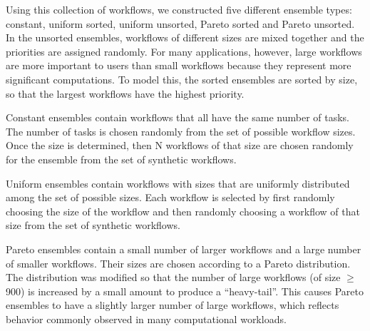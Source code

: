 \documentclass[conference]{IEEEtran}
\begin{document}
Using this collection of workflows, we constructed five different ensemble types:
constant, uniform sorted, uniform unsorted, Pareto sorted and Pareto unsorted.
In the unsorted ensembles, workflows of different sizes are mixed together and
the priorities are assigned randomly.
For many applications, however, large workflows are
more important to users than small workflows because they represent more
significant computations. To model this, the sorted ensembles are sorted by
size, so that the largest workflows have the highest priority.

Constant ensembles contain workflows that all have the same number of tasks. 
The number of tasks is chosen randomly from the set of
possible workflow sizes. Once the size is determined, then N workflows of that
size are chosen randomly for the ensemble from the set of synthetic workflows.

Uniform ensembles contain workflows with sizes that are uniformly distributed
among the set of possible sizes. Each workflow 
is selected by first randomly choosing the size of the workflow
and then randomly choosing a workflow of that size from the set of
synthetic workflows.

Pareto ensembles contain a small number of larger workflows and a large number
of smaller workflows. Their sizes  
are chosen according to a Pareto distribution. The distribution was modified so
that the number of large workflows (of size $\geq$ 900) is increased by a small amount to
produce a ``heavy-tail''. This causes Pareto ensembles to have a slightly larger
number of large workflows, which reflects behavior commonly observed in many
computational workloads. 

\end{document}
